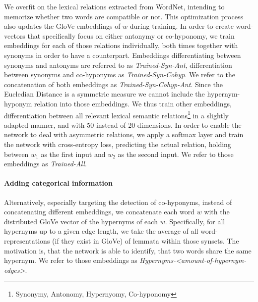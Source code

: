 We overfit on the lexical relations extracted from WordNet, intending to memorize whether two words are compatible or not. This optimization process also updates the GloVe embeddings of $w$ during training. In order to create word-vectors that specifically focus on either antonymy or co-hyponomy, we train embeddings for each of those relations individually, both times together with synonyms in order to have a counterpart. Embeddings differentiating between synonyms and antonyms are referred to as \textit{Trained-Syn-Ant}, differentiation between synonyms and co-hyponyms as \textit{Trained-Syn-Cohyp}. We refer to the concatenation of both embeddings as \textit{Trained-Syn-Cohyp-Ant}. Since the Eucledian Distance is a symmetric measure we cannot include the hypernym-hyponym relation into those embeddings. We thus train other embeddings, differentiation between all relevant lexical semantic relations\footnote{Synonymy, Antonomy, Hypernyomy, Co-hyponomy} in a slightly adapted manner, and with 50 instead of 20 dimensions. In order to enable the network to deal with asymmetric relations, we apply a softmax layer and train the network with cross-entropy loss, predicting the actual relation, holding between $w_1$ as the first input and $w_2$ as the second input. We refer to those embeddings as \textit{Trained-All}.
\paragraph*{Adding categorical information}
Alternatively, especially targeting the detection of co-hyponyms, instead of concatenating different embeddings, we concatenate each word $w$ with the distributed GloVe vector of the hypernyms of each $w$. Specifically, for all hypernyms up to a given edge length, we take the average of all word-representations (if they exist in GloVe) of lemmata within those synsets. The motivation is, that the network is able to identify, that two words share the same hypernym. We refer to those embeddings as \textit{Hypernyms-<amount-of-hypernym-edges>}.
